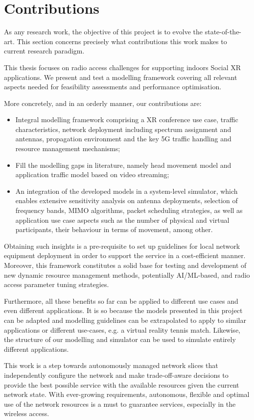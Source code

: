 \section{Contributions}
\label{sec:contributions}

As any research work, the objective of this project is to evolve the state-of-the-art. This section concerns precisely what contributions this work makes to current research paradigm.

This thesis focuses on radio access challenges for supporting indoors Social XR applications. We present and test a modelling framework covering all relevant aspects needed for feasibility assessments and performance optimisation.

More concretely, and in an orderly manner, our contributions are:

\begin{itemize}
    \item Integral modelling framework comprising a XR conference use case, traffic characteristics, network deployment including spectrum assignment and antennas, propagation environment and the key 5G traffic handling and resource management mechanisms;
    \item Fill the modelling gaps in literature, namely head movement model and application traffic model based on video streaming;
    \item An integration of the developed models in a system-level simulator, which enables extensive sensitivity analysis on antenna deployments, selection of frequency bands, MIMO algorithms, packet scheduling strategies, as well as application use case aspects such as the number of physical and virtual participants, their behaviour in terms of movement, among other.
\end{itemize}

Obtaining such insights is a pre-requisite to set up guidelines for local network equipment deployment in order to support the service in a cost-efficient manner. Moreover, this framework constitutes a solid base for testing and development of new dynamic resource management methods, potentially \acs{AI}/\acs{ML}-based, and radio access parameter tuning strategies.

Furthermore, all these benefits so far can be applied to different use cases and even different applications. It is so because the models presented in this project can be adapted and modelling guidelines can be extrapolated to apply to similar applications or different use-cases, e.g. a virtual reality tennis match. Likewise, the structure of our modelling and simulator can be used to simulate entirely different applications. 

This work is a step towards autonomously managed network slices that independently configure the network and make trade-off-aware decisions to provide the best possible service with the available resources given the current network state. With ever-growing requirements, autonomous, flexible and optimal use of the network resources is a must to guarantee services, especially in the wireless access.

